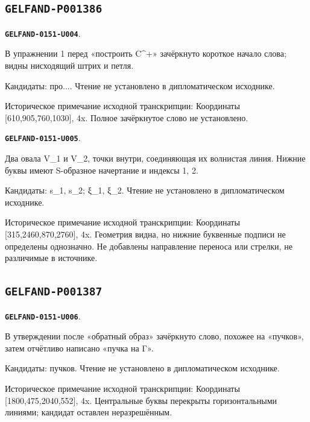 \documentclass[11pt]{article}
\theoremstyle{definition}
\theoremstyle{remark}
\begin{document}
\subsection*{\texttt{GELFAND-P001386}}
\par\noindent\leavevmode{}\label{GELFAND-0151-U004}\label{GELFAND-P001386:cancelled-exercise:note}\textbf{\texttt{GELFAND-0151-U004}}.\nopagebreak[4]\par
В упражнении 1 перед «построить C\textasciicircum{}+» зачёркнуто короткое начало слова; видны нисходящий штрих и петля.\par
Кандидаты: про.... Чтение не установлено в дипломатическом исходнике.\par
Историческое примечание исходной транскрипции: Координаты [610,905,760,1030], 4x. Полное зачёркнутое слово не установлено.\par\medskip
\par\noindent\leavevmode{}\label{GELFAND-0151-U005}\label{GELFAND-P001386:path-diagram:note}\textbf{\texttt{GELFAND-0151-U005}}.\nopagebreak[4]\par
Два овала V\_1 и V\_2, точки внутри, соединяющая их волнистая линия. Нижние буквы имеют S-образное начертание и индексы 1, 2.\par
Кандидаты: s\_1, s\_2; ξ\_1, ξ\_2. Чтение не установлено в дипломатическом исходнике.\par
Историческое примечание исходной транскрипции: Координаты [315,2460,870,2760], 4x. Геометрия видна, но нижние буквенные подписи не определены однозначно. Не добавлены направление переноса или стрелки, не различимые в источнике.\par\medskip
\subsection*{\texttt{GELFAND-P001387}}
\par\noindent\leavevmode{}\label{GELFAND-0151-U006}\label{GELFAND-P001387:cancelled-pullback:note}\textbf{\texttt{GELFAND-0151-U006}}.\nopagebreak[4]\par
В утверждении после «обратный образ» зачёркнуто слово, похожее на «пучков», затем отчётливо написано «пучка на Γ».\par
Кандидаты: пучков. Чтение не установлено в дипломатическом исходнике.\par
Историческое примечание исходной транскрипции: Координаты [1800,475,2040,552], 4x. Центральные буквы перекрыты горизонтальными линиями; кандидат оставлен неразрешённым.\par\medskip
\end{document}
